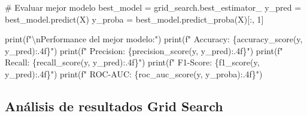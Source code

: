 \documentclass[
  doc,
  floatsintext,
  longtable,
  a4paper,
  nolmodern,
  notxfonts,
  notimes,
  12pt,
  colorlinks=true,linkcolor=blue,citecolor=blue,urlcolor=blue]{apa7}
\newenvironment{Shaded}{\begin{snugshade}}{\end{snugshade}}
\newcommand{\BuiltInTok}[1]{\textcolor[rgb]{0.00,0.23,0.31}{#1}}
\newcommand{\CharTok}[1]{\textcolor[rgb]{0.13,0.47,0.30}{#1}}
\newcommand{\CommentTok}[1]{\textcolor[rgb]{0.37,0.37,0.37}{#1}}
\newcommand{\DecValTok}[1]{\textcolor[rgb]{0.68,0.00,0.00}{#1}}
\newcommand{\NormalTok}[1]{\textcolor[rgb]{0.00,0.23,0.31}{#1}}
\newcommand{\OperatorTok}[1]{\textcolor[rgb]{0.37,0.37,0.37}{#1}}
\newcommand{\SpecialCharTok}[1]{\textcolor[rgb]{0.37,0.37,0.37}{#1}}
\newcommand{\SpecialStringTok}[1]{\textcolor[rgb]{0.13,0.47,0.30}{#1}}
\begin{document}
\begin{Shaded}
\begin{Highlighting}[]
\CommentTok{\# Evaluar mejor modelo}
\NormalTok{best\_model }\OperatorTok{=}\NormalTok{ grid\_search.best\_estimator\_}
\NormalTok{y\_pred }\OperatorTok{=}\NormalTok{ best\_model.predict(X)}
\NormalTok{y\_proba }\OperatorTok{=}\NormalTok{ best\_model.predict\_proba(X)[:, }\DecValTok{1}\NormalTok{]}

\BuiltInTok{print}\NormalTok{(}\SpecialStringTok{f"}\CharTok{\textbackslash{}n}\SpecialStringTok{Performance del mejor modelo:"}\NormalTok{)}
\BuiltInTok{print}\NormalTok{(}\SpecialStringTok{f"  Accuracy: }\SpecialCharTok{\{}\NormalTok{accuracy\_score(y, y\_pred)}\SpecialCharTok{:.4f\}}\SpecialStringTok{"}\NormalTok{)}
\BuiltInTok{print}\NormalTok{(}\SpecialStringTok{f"  Precision: }\SpecialCharTok{\{}\NormalTok{precision\_score(y, y\_pred)}\SpecialCharTok{:.4f\}}\SpecialStringTok{"}\NormalTok{)}
\BuiltInTok{print}\NormalTok{(}\SpecialStringTok{f"  Recall: }\SpecialCharTok{\{}\NormalTok{recall\_score(y, y\_pred)}\SpecialCharTok{:.4f\}}\SpecialStringTok{"}\NormalTok{)}
\BuiltInTok{print}\NormalTok{(}\SpecialStringTok{f"  F1{-}Score: }\SpecialCharTok{\{}\NormalTok{f1\_score(y, y\_pred)}\SpecialCharTok{:.4f\}}\SpecialStringTok{"}\NormalTok{)}
\BuiltInTok{print}\NormalTok{(}\SpecialStringTok{f"  ROC{-}AUC: }\SpecialCharTok{\{}\NormalTok{roc\_auc\_score(y, y\_proba)}\SpecialCharTok{:.4f\}}\SpecialStringTok{"}\NormalTok{)}
\end{Highlighting}
\end{Shaded}

\subsection{Análisis de resultados Grid
Search}\label{anuxe1lisis-de-resultados-grid-search}
\end{document}
